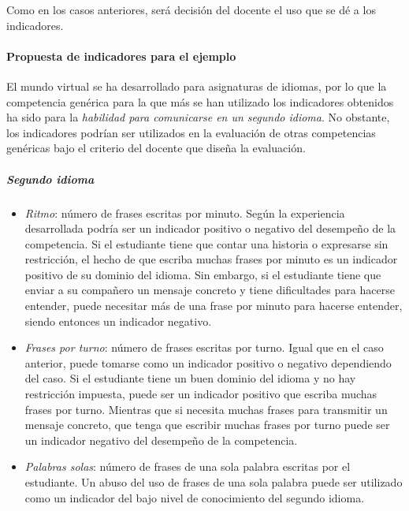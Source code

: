 			Como en los casos anteriores, será decisión del docente el uso que se dé a los indicadores.

			\paragraph*{Propuesta de indicadores para el ejemplo}

			El mundo virtual se ha desarrollado para asignaturas de idiomas, por lo que la competencia genérica para la que más se han utilizado los indicadores obtenidos ha sido para la \emph{habilidad para comunicarse en un segundo idioma}. No obstante, los indicadores podrían ser utilizados en la evaluación de otras competencias genéricas bajo el criterio del docente que diseña la evaluación.


			\subparagraph*{Segundo idioma}
\begin{itemize}
\item \emph{Ritmo}: número de frases escritas por minuto. Según la experiencia desarrollada podría ser un indicador positivo o negativo del desempeño de la competencia. Si el estudiante tiene que contar una historia o expresarse sin restricción, el hecho de que escriba muchas frases por minuto es un indicador positivo de su dominio del idioma. Sin embargo, si el estudiante tiene que enviar a su compañero un mensaje concreto y tiene dificultades  para hacerse entender, puede necesitar más de una frase por minuto para hacerse entender, siendo entonces un indicador negativo.
\item \emph{Frases por turno}: número de frases escritas por turno. Igual que en el caso anterior, puede tomarse como un indicador positivo o negativo dependiendo del caso. Si el estudiante tiene un buen dominio del idioma y no hay restricción impuesta, puede ser un indicador positivo que escriba muchas frases por turno. Mientras que si necesita muchas frases para transmitir un mensaje concreto, que tenga que escribir muchas frases por turno puede ser un indicador negativo del desempeño de la competencia.
\item \emph{Palabras solas}: número de frases de una sola palabra escritas por el estudiante. Un abuso del uso de frases de una sola palabra puede ser utilizado como un indicador del bajo nivel de conocimiento del segundo idioma.
\end{itemize}

